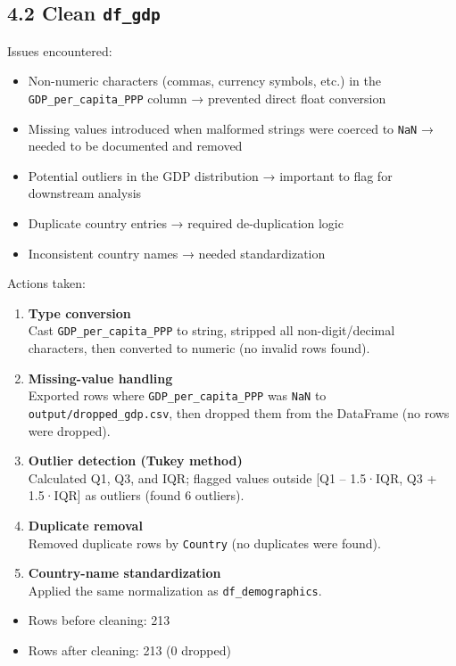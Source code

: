 \documentclass[14pt]{extarticle}
\begin{document}
\subsection*{4.2 Clean \texttt{df\_gdp}}
Issues encountered:
\begin{itemize}
\item Non-numeric characters (commas, currency symbols, etc.) in the
\texttt{GDP\_per\_capita\_PPP} column → prevented direct float conversion
\item Missing values introduced when malformed strings were coerced to \texttt{NaN}
→ needed to be documented and removed
\item Potential outliers in the GDP distribution → important to flag for
downstream analysis
\item Duplicate country entries → required de-duplication logic
\item Inconsistent country names → needed standardization
\end{itemize}
Actions taken:
\begin{enumerate}
\item \textbf{Type conversion}\\
Cast \texttt{GDP\_per\_capita\_PPP} to string, stripped all non-digit/decimal
characters, then converted to numeric (no invalid rows found).
\item \textbf{Missing-value handling}\\
  Exported rows where \texttt{GDP\_per\_capita\_PPP} was \texttt{NaN} to
\texttt{output/dropped\_gdp.csv}, then dropped them from the DataFrame (no rows were dropped).
\item \textbf{Outlier detection (Tukey method)}\\
Calculated Q1, Q3, and IQR; flagged values outside [Q1 – 1.5·IQR, Q3 +
1.5·IQR] as outliers (found 6 outliers).
\item \textbf{Duplicate removal}\\
  Removed duplicate rows by \texttt{Country} (no duplicates were found).
\item \textbf{Country-name standardization}\\
  Applied the same normalization as \texttt{df\_demographics}.
\end{enumerate}
\begin{itemize}
\item Rows before cleaning: 213
\item Rows after cleaning: 213 (0 dropped)
\end{itemize}
\end{document}
